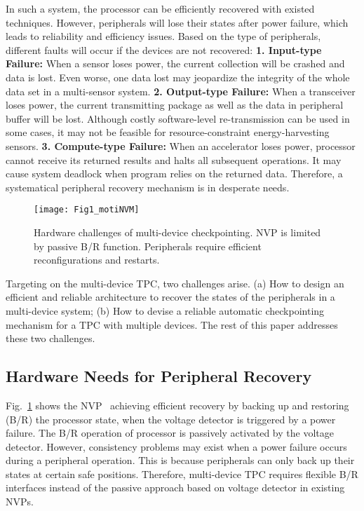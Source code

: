 %
%
In such a system, the processor can be efficiently recovered with existed techniques. 
However, peripherals will lose their states after power failure, which leads to reliability and efficiency issues. 
Based on the type of peripherals, different faults will occur if the devices are not recovered: 
\textbf{1. Input-type Failure:} When a sensor loses power, the current collection will be crashed and data is lost. 
Even worse, one data lost may jeopardize the integrity of the whole data set in a multi-sensor system.
\textbf{2. Output-type Failure:} When a transceiver loses power, the current transmitting package as well as the data in peripheral buffer will be lost. Although costly software-level re-transmission can be used in some cases, it may not be feasible for resource-constraint energy-harvesting sensors. 
\textbf{3. Compute-type Failure:} When an accelerator loses power, processor cannot receive its returned results and halts all subsequent operations.
It may cause system deadlock when program relies on the returned data.
Therefore, a systematical peripheral recovery mechanism is in desperate needs. 

\begin{figure}[t]
    \centering
    \texttt{[image: Fig1\_motiNVM]}
    \caption{Hardware challenges of multi-device checkpointing. NVP is limited by passive B/R function. Peripherals require efficient reconfigurations and restarts.}
    \label{fig:motiNVM}
\end{figure}

Targeting on the multi-device TPC, two challenges arise.
(a) How to design an efficient and reliable architecture to recover the states of the peripherals in a multi-device system;
(b) How to devise a reliable automatic checkpointing mechanism for a TPC with multiple devices.
The rest of this paper addresses these two challenges.

\subsection{Hardware Needs for Peripheral Recovery} \label{sec:motiHW}
%
Fig.~\ref{fig:motiNVM} shows the NVP~\cite{wang20123us} achieving efficient recovery by backing up and restoring (B/R) the processor state, when the voltage detector is triggered by a power failure.
The B/R operation of processor is passively activated by the voltage detector.
However, consistency problems may exist when a power failure occurs during a peripheral operation.
This is because peripherals can only back up their states at certain safe positions.
Therefore, multi-device TPC requires flexible B/R interfaces instead of the passive approach based on voltage detector in existing NVPs.


